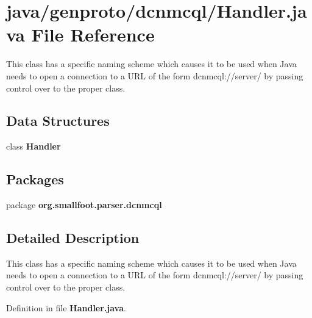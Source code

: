 \section{java/genproto/dcnmcql/\+Handler.java File Reference}
\label{genproto_2dcnmcql_2Handler_8java}


This class has a specific naming scheme which causes it to be used when Java needs to open a connection to a U\+R\+L of the form dcnmcql\+://server/ by passing control over to the proper class.  


\subsection*{Data Structures}
\begin{DoxyCompactItemize}
\item 
class {\bf Handler}
\end{DoxyCompactItemize}
\subsection*{Packages}
\begin{DoxyCompactItemize}
\item 
package {\bf org.\+smallfoot.\+parser.\+dcnmcql}
\end{DoxyCompactItemize}


\subsection{Detailed Description}
This class has a specific naming scheme which causes it to be used when Java needs to open a connection to a U\+R\+L of the form dcnmcql\+://server/ by passing control over to the proper class. 



Definition in file {\bf Handler.\+java}.

